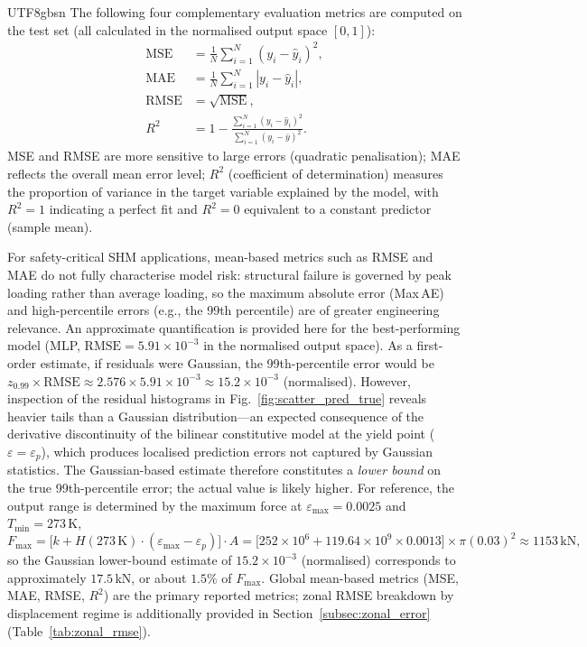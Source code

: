 \documentclass[a4paper,12pt]{report}
\begin{document}
\begin{CJK}{UTF8}{gbsn}
The following four complementary evaluation metrics are computed on the test set (all
calculated in the normalised output space $[0,1]$):
\begin{align}
  \text{MSE} &= \frac{1}{N}\sum_{i=1}^{N}(y_i - \hat{y}_i)^2, \label{eq:mse_metric}\\
  \text{MAE} &= \frac{1}{N}\sum_{i=1}^{N}|y_i - \hat{y}_i|, \label{eq:mae_metric}\\
  \text{RMSE} &= \sqrt{\text{MSE}}, \label{eq:rmse_metric}\\
  R^2 &= 1 - \frac{\sum_{i=1}^{N}(y_i - \hat{y}_i)^2}{\sum_{i=1}^{N}(y_i - \bar{y})^2}.
  \label{eq:r2_metric}
\end{align}
MSE and RMSE are more sensitive to large errors (quadratic penalisation); MAE reflects
the overall mean error level; $R^2$ (coefficient of determination) measures the
proportion of variance in the target variable explained by the model, with $R^2 = 1$
indicating a perfect fit and $R^2 = 0$ equivalent to a constant predictor (sample mean).

For safety-critical SHM applications, mean-based metrics such as RMSE and MAE do not
fully characterise model risk: structural failure is governed by peak loading rather than
average loading, so the maximum absolute error (Max\,AE) and high-percentile errors
(e.g., the 99th percentile) are of greater engineering relevance. An approximate
quantification is provided here for the best-performing model (MLP,
$\mathrm{RMSE} = 5.91\times10^{-3}$ in the normalised output space). As a first-order estimate, if residuals were Gaussian, the 99th-percentile
error would be $z_{0.99} \times \mathrm{RMSE} \approx 2.576 \times 5.91\times10^{-3}
\approx 15.2\times10^{-3}$ (normalised). However, inspection of the residual histograms
in Fig.~\ref{fig:scatter_pred_true} reveals heavier tails than a Gaussian
distribution---an expected consequence of the derivative discontinuity of the bilinear
constitutive model at the yield point ($\varepsilon = \varepsilon_p$), which produces
localised prediction errors not captured by Gaussian statistics. The Gaussian-based
estimate therefore constitutes a \emph{lower bound} on the true 99th-percentile error;
the actual value is likely higher. For reference, the output range is determined by the
maximum force at $\varepsilon_{\max}=0.0025$ and $T_{\min}=273$\,K,
\[
  F_{\max} = \bigl[k + H(273\,\mathrm{K})\cdot(\varepsilon_{\max}-\varepsilon_p)\bigr]\cdot A
           = \bigl[252\times10^6 + 119.64\times10^9\times0.0013\bigr]\times\pi(0.03)^2
           \approx 1153\,\mathrm{kN},
\]
so the Gaussian lower-bound estimate of $15.2\times10^{-3}$ (normalised) corresponds to
approximately $17.5$\,kN, or about $1.5\%$ of $F_{\max}$. Global mean-based metrics
(MSE, MAE, RMSE, $R^2$) are the primary reported metrics; zonal RMSE breakdown by
displacement regime is additionally provided in
Section~\ref{subsec:zonal_error} (Table~\ref{tab:zonal_rmse}).


\end{CJK}
\end{document}
